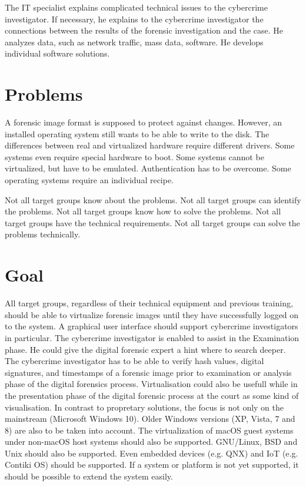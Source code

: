 The IT specialist explains complicated technical issues to the cybercrime investigator. If necessary, he explains to the cybercrime investigator the connections between the results of the forensic investigation and the case. He analyzes data, such as network traffic, mass data, software. He develops individual software solutions.

\section{Problems}

A forensic image format is supposed to protect against changes. However, an installed operating system still wants to be able to write to the disk. The differences between real and virtualized hardware require different drivers. Some systems even require special hardware to boot. Some systems cannot be virtualized, but have to be emulated. Authentication has to be overcome. Some operating systems require an individual recipe.

Not all target groups know about the problems. Not all target groups can identify the problems. Not all target groups know how to solve the problems. Not all target groups have the technical requirements. Not all target groups can solve the problems technically.

\section{Goal}


All target groups, regardless of their technical equipment and previous training, should be able to virtualize forensic images until they have successfully logged on to the system.
A graphical user interface should support cybercrime investigators in particular.
The cybercrime investigator is enabled to assist in the Examination phase. \cite{Aarnes2017:34} %
He could give the digital forensic expert a hint where to search deeper.
The cybercrime investigator has to be able to verify hash values, digital signatures, and timestamps of a forensic image prior to examination or analysis phase of the digital forensics process.
Virtualisation could also be usefull while in the presentation phase of the digital forensic process at the court as some kind of visualisation. \cite{Aarnes2017:46} %
In contrast to propretary solutions, the focus is not only on the mainstream (Microsoft Windows 10). Older Windows versions (XP, Vista, 7 and 8) are also to be taken into account. The virtualization of macOS guest systems under non-macOS host systems should also be supported. GNU/Linux, BSD and Unix should also be supported. Even embedded devices (e.g. QNX) and IoT (e.g. Contiki OS) should be supported.
If a system or platform is not yet supported, it should be possible to extend the system easily.

